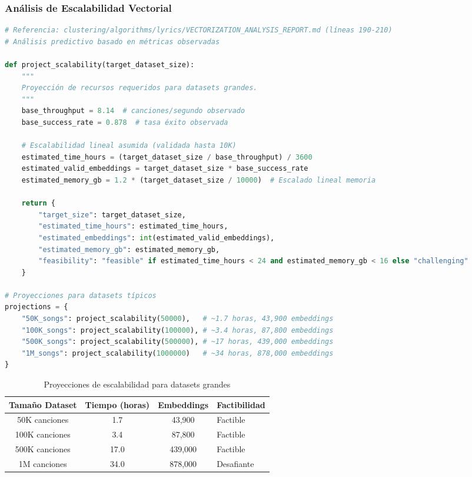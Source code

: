 \documentclass[12pt,a4paper]{article}
\begin{document}
\subsubsection{Análisis de Escalabilidad Vectorial}

\begin{lstlisting}[language=Python, caption={Proyección de escalabilidad para datasets grandes}]
# Referencia: clustering/algorithms/lyrics/VECTORIZATION_ANALYSIS_REPORT.md (líneas 190-210)
# Análisis predictivo basado en métricas observadas

def project_scalability(target_dataset_size):
    """
    Proyección de recursos requeridos para datasets grandes.
    """
    base_throughput = 8.14  # canciones/segundo observado
    base_success_rate = 0.878  # tasa éxito observada

    # Escalabilidad lineal asumida (validada hasta 10K)
    estimated_time_hours = (target_dataset_size / base_throughput) / 3600
    estimated_valid_embeddings = target_dataset_size * base_success_rate
    estimated_memory_gb = 1.2 * (target_dataset_size / 10000)  # Escalado lineal memoria

    return {
        "target_size": target_dataset_size,
        "estimated_time_hours": estimated_time_hours,
        "estimated_embeddings": int(estimated_valid_embeddings),
        "estimated_memory_gb": estimated_memory_gb,
        "feasibility": "feasible" if estimated_time_hours < 24 and estimated_memory_gb < 16 else "challenging"
    }

# Proyecciones para datasets típicos
projections = {
    "50K_songs": project_scalability(50000),   # ~1.7 horas, 43,900 embeddings
    "100K_songs": project_scalability(100000), # ~3.4 horas, 87,800 embeddings
    "500K_songs": project_scalability(500000), # ~17 horas, 439,000 embeddings
    "1M_songs": project_scalability(1000000)   # ~34 horas, 878,000 embeddings
}
\end{lstlisting}

\begin{table}[h]
\centering
\caption{Proyecciones de escalabilidad para datasets grandes}
\begin{tabular}{@{}cccl@{}}
\toprule
\textbf{Tamaño Dataset} & \textbf{Tiempo (horas)} & \textbf{Embeddings} & \textbf{Factibilidad} \\
\midrule
50K canciones & 1.7 & 43,900 & Factible \\
100K canciones & 3.4 & 87,800 & Factible \\
500K canciones & 17.0 & 439,000 & Factible \\
1M canciones & 34.0 & 878,000 & Desafiante \\
\bottomrule
\end{tabular}
\end{table}
\end{document}
